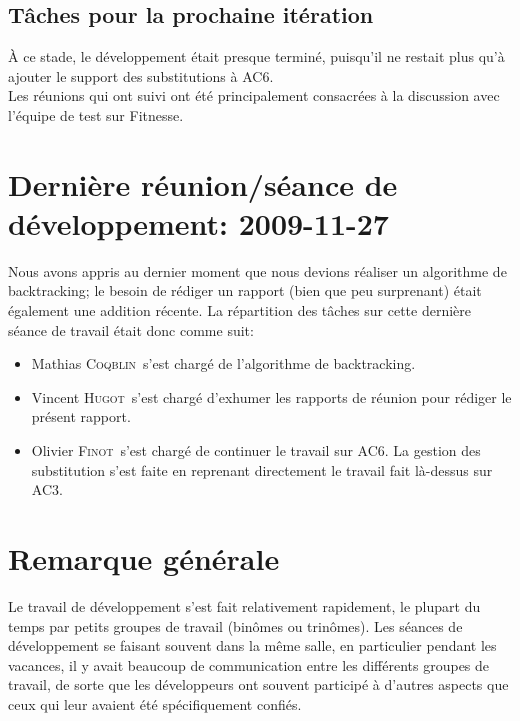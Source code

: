 \documentclass[a4paper,12pt]{article}
\def\familyname{\textsc}
\def\firstname#1{#1}
\def\groupmember#1#2{\firstname{#1} \familyname{#2}}
\def\mmat{\groupmember{Mathias}{Coqblin}}
\def\moli{\groupmember{Olivier}{Finot}}
\def\mvin{\groupmember{Vincent}{Hugot}}
\begin{document}
\subsection{Tâches pour la prochaine itération}

\`A ce stade, le développement était presque terminé, puisqu'il
 ne restait plus qu'à ajouter le support des substitutions à AC6.\mk\\
%
Les réunions qui ont suivi ont été principalement consacrées à
la discussion avec l'équipe de test sur Fitnesse.


\section{Dernière réunion/séance de développement: 2009-11-27}

Nous avons appris au dernier moment que nous devions réaliser 
un algorithme de backtracking; le besoin de rédiger un rapport
(bien que peu surprenant) était également une addition récente.
La répartition des tâches sur cette dernière séance de 
travail était donc comme suit: 
\begin{itemize}
 \item \mmat\ s'est chargé de l'algorithme de backtracking.
\item \mvin\ s'est chargé d'exhumer les rapports de réunion pour
rédiger le présent rapport.
\item \moli\ s'est chargé de continuer le travail sur AC6.
La gestion des substitution s'est faite en reprenant directement le travail fait là-dessus sur AC3.
\end{itemize}

\section{Remarque générale}

Le travail de développement s'est fait relativement rapidement, 
le plupart du temps par petits groupes de travail (binômes ou trinômes).
Les séances de développement se faisant souvent dans la même salle,
en particulier pendant les vacances,
il y avait beaucoup de communication entre les différents groupes de travail,
de sorte que les développeurs ont souvent 
participé à d'autres aspects que ceux qui leur avaient été spécifiquement
confiés.
\end{document}
